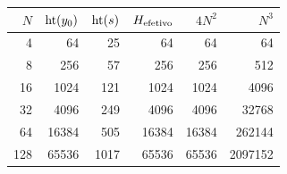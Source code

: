 \begin{tabular}{rrrrrr}
\toprule
$N$ & $\operatorname{ht}(y_0)$ & $\operatorname{ht}(s)$ & $H_{\rm efetivo}$ & $4N^2$ & $N^3$\\
\midrule
4 & 64 & 25 & 64 & 64 & 64\\
8 & 256 & 57 & 256 & 256 & 512\\
16 & 1024 & 121 & 1024 & 1024 & 4096\\
32 & 4096 & 249 & 4096 & 4096 & 32768\\
64 & 16384 & 505 & 16384 & 16384 & 262144\\
128 & 65536 & 1017 & 65536 & 65536 & 2097152\\
\bottomrule
\end{tabular}
